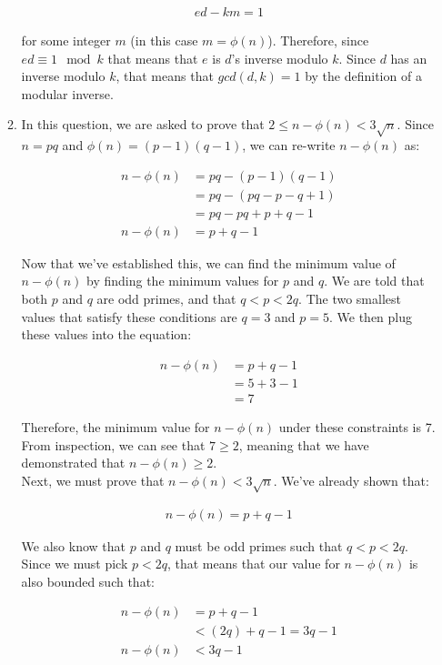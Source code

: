 \documentclass[11pt]{article}
\theoremstyle{definition}
\begin{document}
\begin{enumerate}
\begin{enumerate}
\begin{align*}
    ed - km = 1
\end{align*}

for some integer $m$ (in this case $m = \phi(n)$). Therefore, since $ed \equiv 1 \mod{k}$ that means that $e$ is $d$'s inverse modulo $k$. Since $d$ has an inverse modulo $k$, that means that $gcd(d, k) = 1$ by the definition of a modular inverse.
\\

\item %
In this question, we are asked to prove that $2 \leq n - \phi(n) < 3\sqrt{n}$. Since $n = pq$ and $\phi(n) = (p-1)(q-1)$, we can re-write $n - \phi(n)$ as:

\begin{align*}
    n - \phi(n) &= pq - (p - 1)(q - 1) \\
    &= pq - (pq - p - q + 1) \\
    &= pq - pq + p + q - 1 \\
    n - \phi(n) &= p + q - 1
\end{align*}

Now that we've established this, we can find the minimum value of $n - \phi(n)$ by finding the minimum values for $p$ and $q$. We are told that both $p$ and $q$ are odd primes, and that $q < p < 2q$. The two smallest values that satisfy these conditions are $q = 3$ and $p = 5$. We then plug these values into the equation:

\begin{align*}
    n - \phi(n) &= p + q - 1 \\
    &= 5 + 3 - 1 \\
    &= 7
\end{align*}

Therefore, the minimum value for $n - \phi(n)$ under these constraints is 7. From inspection, we can see that $7 \geq 2$, meaning that we have demonstrated that $n - \phi(n) \geq 2$.
\\

Next, we must prove that $n - \phi(n) < 3\sqrt{n}$. We've already shown that:

\begin{align*}
    n - \phi(n) = p + q - 1
\end{align*}

We also know that $p$ and $q$ must be odd primes such that $q < p < 2q$. Since we must pick $p < 2q$, that means that our value for $n - \phi(n)$ is also bounded such that:

\begin{align*}
    n - \phi(n) &= p + q - 1 \\
    &< (2q) + q - 1  = 3q - 1\\
    n - \phi(n) &< 3q - 1
\end{align*}


\end{enumerate}
\end{enumerate}
\end{document}

